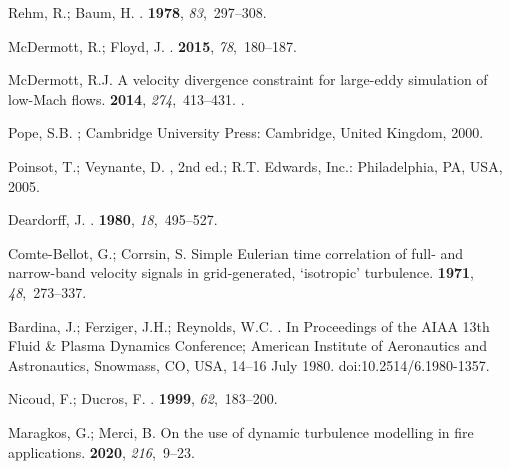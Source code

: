 \documentclass[atmosphere,article,accept,moreauthors,pdftex]{Definitions/mdpi}
\begin{document}
\begin{thebibliography}{999}
Rehm, R.; Baum, H.
.
 {\bf 1978}, {\em 83},~297--308.

McDermott, R.; Floyd, J.
.
 {\bf 2015}, {\em 78},~180--187.

McDermott, R.J.
\newblock A velocity divergence constraint for large-eddy simulation of
  low-Mach flows.
 {\bf 2014}, {\em
  274},~413--431.
.

Pope, S.B.
; Cambridge University Press: Cambridge, United Kingdom, 2000.


Poinsot, T.; Veynante, D.
, 2nd ed.; R.T. Edwards,
  Inc.: Philadelphia, PA, USA,  2005.

Deardorff, J.
.
 {\bf 1980}, {\em 18},~495--527.

Comte-{B}ellot, G.; Corrsin, S.
\newblock Simple {Eulerian} time correlation of full- and narrow-band velocity
  signals in grid-generated, `isotropic' turbulence.
 {\bf 1971}, {\em 48},~273--337.

Bardina, J.; Ferziger, J.H.; Reynolds, W.C.
.
\newblock   In Proceedings of the  AIAA 13th Fluid \& Plasma Dynamics Conference; American Institute of
  Aeronautics and Astronautics,  Snowmass, CO, USA,   14--16 July 1980. doi:10.2514/6.1980-1357. 


Nicoud, F.; Ducros, F.
.
 {\bf 1999}, {\em
  62},~183--200.

Maragkos, G.; Merci, B.
\newblock On the use of dynamic turbulence modelling in fire applications.
 {\bf 2020}, {\em 216},~9--23.


\end{thebibliography}
\end{document}
